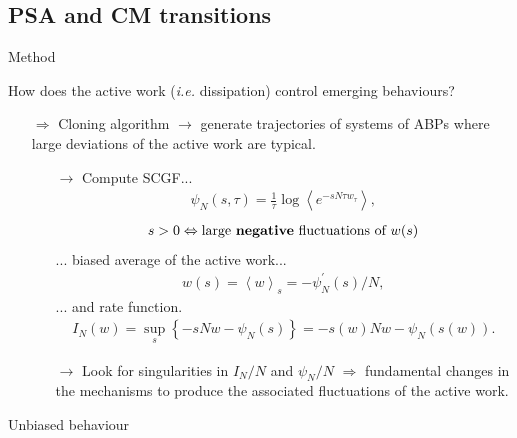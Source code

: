 \documentclass{beamer}
\begin{document}
\subsection{PSA and CM transitions}

\begin{frame}{Method}

How does the active work (\textit{i.e.} dissipation) control emerging behaviours?

\return
\begin{itemize}
  \item[$\Rightarrow$] Cloning algorithm $\rightarrow$ generate trajectories of systems of ABPs where large deviations of the active work are typical.\pause
  \begin{itemize}
    \item[$\rightarrow$] Compute SCGF...
    \begin{align*}
      \psi_N(s, \tau) = \frac{1}{\tau} \log\left<e^{- s N \tau w_{\tau}}\right>,
    \end{align*}
    \begin{align*}
      s > 0 \Leftrightarrow \text{large {\bf negative} fluctuations of } w(s)
    \end{align*}
    ... biased average of the active work...
    \begin{align*}
      w(s) = \left<w\right>_s = - \psi_N^{\prime}(s)/N,
    \end{align*}
    ... and rate function.
    \begin{align*}
      I_N(w) = \sup_s \left\{- s N w - \psi_N(s)\right\} = - s(w) N w - \psi_N(s(w)).
    \end{align*}
    \pause
    \item[$\rightarrow$] Look for singularities in $I_N/N$ and $\psi_N/N$ $\Rightarrow$ fundamental changes in the mechanisms to produce the associated fluctuations of the active work.
  \end{itemize}
\end{itemize}

\end{frame}

\begin{frame}{Unbiased behaviour}



\end{frame}
\end{document}

